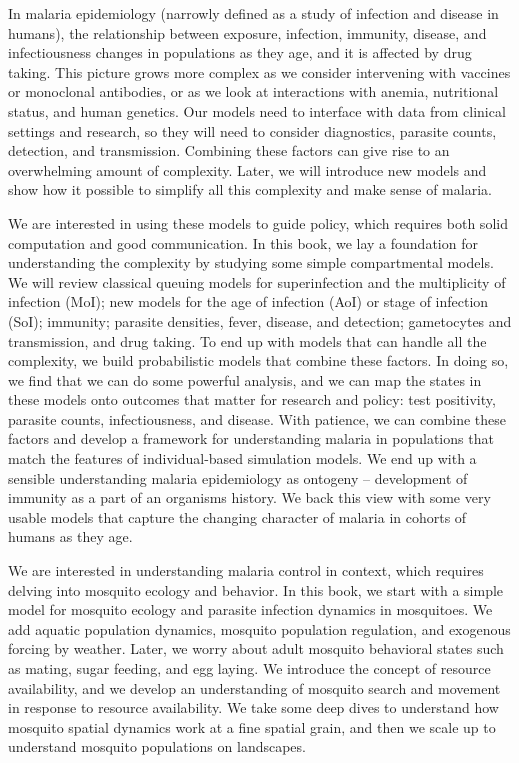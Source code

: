 \documentclass[
]{book}
\begin{document}
In malaria epidemiology (narrowly defined as a study of infection and disease in humans), the relationship between exposure, infection, immunity, disease, and infectiousness changes in populations as they age, and it is affected by drug taking. This picture grows more complex as we consider intervening with vaccines or monoclonal antibodies, or as we look at interactions with anemia, nutritional status, and human genetics. Our models need to interface with data from clinical settings and research, so they will need to consider diagnostics, parasite counts, detection, and transmission. Combining these factors can give rise to an overwhelming amount of complexity. Later, we will introduce new models and show how it possible to simplify all this complexity and make sense of malaria.

We are interested in using these models to guide policy, which requires both solid computation and good communication. In this book, we lay a foundation for understanding the complexity by studying some simple compartmental models. We will review classical queuing models for superinfection and the multiplicity of infection (MoI); new models for the age of infection (AoI) or stage of infection (SoI); immunity; parasite densities, fever, disease, and detection; gametocytes and transmission, and drug taking. To end up with models that can handle all the complexity, we build probabilistic models that combine these factors. In doing so, we find that we can do some powerful analysis, and we can map the states in these models onto outcomes that matter for research and policy: test positivity, parasite counts, infectiousness, and disease. With patience, we can combine these factors and develop a framework for understanding malaria in populations that match the features of individual-based simulation models. We end up with a sensible understanding malaria epidemiology as ontogeny -- development of immunity as a part of an organisms history. We back this view with some very usable models that capture the changing character of malaria in cohorts of humans as they age.

We are interested in understanding malaria control in context, which requires delving into mosquito ecology and behavior. In this book, we start with a simple model for mosquito ecology and parasite infection dynamics in mosquitoes. We add aquatic population dynamics, mosquito population regulation, and exogenous forcing by weather. Later, we worry about adult mosquito behavioral states such as mating, sugar feeding, and egg laying. We introduce the concept of resource availability, and we develop an understanding of mosquito search and movement in response to resource availability. We take some deep dives to understand how mosquito spatial dynamics work at a fine spatial grain, and then we scale up to understand mosquito populations on landscapes.
\end{document}

